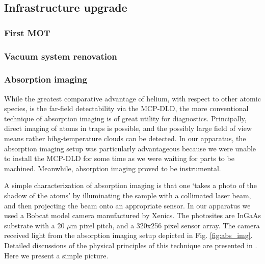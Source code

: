 \subsection*{Infrastructure upgrade}

\subsubsection{First MOT}
\subsubsection{Vacuum system renovation}
\subsubsection*{Absorption imaging}

While the greatest comparative advantage of helium, with respect to other atomic species, is the far-field detectability via the MCP-DLD, the more conventional technique of absorption imaging is of great utility for diagnostics.
	Principally, direct imaging of atoms in traps is possible, and the possibly large field of view means rather hihg-temperature clouds can be detected.
	In our apparatus, the absorption imaging setup was particularly advantageous because we were unable to install the MCP-DLD for some time as we were waiting for parts to be machined.
	Meanwhile, absorption imaging proved to be instrumental.

A simple characterization of absorption imaging is that one `takes a photo of the shadow of the atoms' by illuminating the sample with a collimated laser beam, and then projecting the beam onto an appropriate sensor.
	In our apparatus we used a Bobcat model camera manufactured by Xenics.
	The photosites are InGaAs substrate with a 20 $\mu$m pixel pitch, and a 320x256 pixel sensor array.
	The camera received light from the absorption imaging setup depicted in Fig.
	\ref{fig:abs_img}.
	Detailed discussions of the physical principles of this technique are presented in \cite{MakingProbingUnderstanding,TychkovThesis}.
	Here we present a simple picture.

